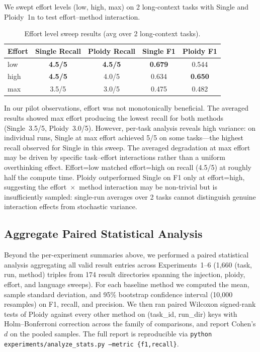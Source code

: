 \documentclass[11pt]{article}
\begin{document}
We swept effort levels (low, high, max) on 2 long-context tasks with Single and Ploidy~1n to test effort--method interaction.

\begin{table}[H]
\centering
\caption{Effort level sweep results (avg over 2 long-context tasks).}
\label{tab:effort-sweep}
\small
\begin{tabular}{@{}lcccc@{}}
\toprule
\textbf{Effort} & \textbf{Single Recall} & \textbf{Ploidy Recall} & \textbf{Single F1} & \textbf{Ploidy F1} \\
\midrule
low  & \textbf{4.5/5} & \textbf{4.5/5} & \textbf{0.679} & 0.544 \\
high & \textbf{4.5/5} & 4.0/5 & 0.634 & \textbf{0.650} \\
max  & 3.5/5 & 3.0/5 & 0.475 & 0.482 \\
\bottomrule
\end{tabular}
\end{table}

In our pilot observations, effort was not monotonically beneficial. The averaged results showed max effort producing the lowest recall for both methods (Single~3.5/5, Ploidy~3.0/5). However, per-task analysis reveals high variance: on individual runs, Single at max effort achieved 5/5 on some tasks---the highest recall observed for Single in this sweep. The averaged degradation at max effort may be driven by specific task--effort interactions rather than a uniform overthinking effect. Effort=low matched effort=high on recall (4.5/5) at roughly half the compute time. Ploidy outperformed Single on F1 only at effort=high, suggesting the effort~$\times$~method interaction may be non-trivial but is insufficiently sampled: single-run averages over 2 tasks cannot distinguish genuine interaction effects from stochastic variance.

\subsection{Aggregate Paired Statistical Analysis}
\label{sec:aggregate-stats}

Beyond the per-experiment summaries above, we performed a paired statistical analysis aggregating all valid result entries across Experiments~1--6 (1{,}660 (task, run, method) triples from 174 result directories spanning the injection, ploidy, effort, and language sweeps). For each baseline method we computed the mean, sample standard deviation, and 95\% bootstrap confidence interval (10{,}000 resamples) on F1, recall, and precision. We then ran paired Wilcoxon signed-rank tests of Ploidy against every other method on (task\_id, run\_dir) keys with Holm--Bonferroni correction across the family of comparisons, and report Cohen's $d$ on the pooled samples. The full report is reproducible via \texttt{python experiments/analyze\_stats.py --metric \{f1,recall\}}.
\end{document}
